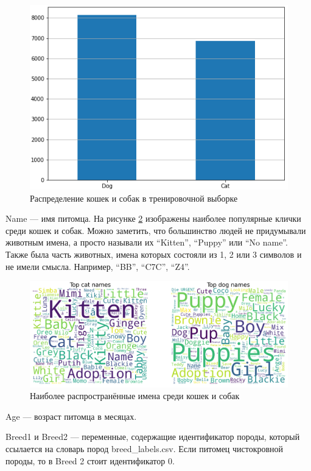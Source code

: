 \documentclass[14pt]{mmcs_article}
\begin{document}
\begin{figure}[H]
	\centering
	\includegraphics[scale=1.2]{type.png}
	\caption{Распределение кошек и собак в тренировочной выборке}\label{analyse:type}
\end{figure}

Name --- имя питомца. На рисунке \ref{analyse:names} изображены наиболее популярные клички среди кошек и собак. Можно заметить, что большинство людей не придумывали животным имена, а просто называли их “Kitten”, “Puppy” или “No name”. Также была часть животных, имена которых состояли из 1, 2 или 3 символов и не имели смысла. Например, “BB”, “C7C”, “Z4”. 

\begin{figure}[H]
	\centering
	\includegraphics[scale=0.5]{names.png}
	\caption{Наиболее распространённые имена среди кошек и собак}\label{analyse:names}
\end{figure}

Age --- возраст питомца в месяцах.

Breed1 и Breed2 --- переменные, содержащие идентификатор породы, который ссылается на словарь пород breed\_labels.csv. Если питомец чистокровной породы, то в Breed 2 стоит идентификатор 0.
\end{document}
